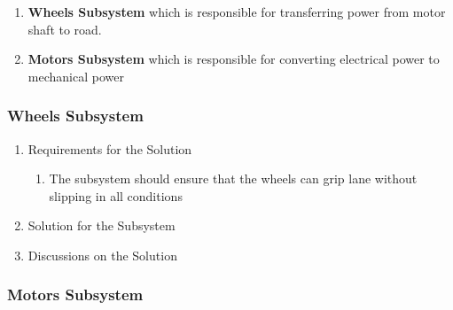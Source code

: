 \documentclass[a4paper,12pt]{article}
\begin{document}
	

	\begin{enumerate}
		\item \textbf{Wheels Subsystem} which is responsible for transferring power from motor shaft to road.
		\item \textbf{Motors Subsystem} which is responsible for converting electrical power to mechanical power
	\end{enumerate}


	\subsubsection{Wheels Subsystem}

		\begin{enumerate}
			\item {Requirements for the Solution}
			
			\begin{enumerate}
				\item The subsystem should ensure that the wheels can grip lane without slipping in all conditions 
			\end{enumerate}


	\item {Solution for the Subsystem}
	
	


	\item {Discussions on the Solution}
	

	\end{enumerate}



	\subsubsection{Motors Subsystem}
\end{document}

